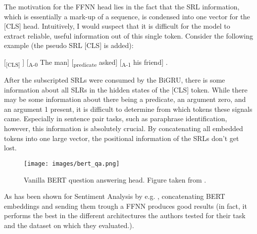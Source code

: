 
The motivation for the FFNN head lies in the fact that the SRL information, which is essentially
a mark-up of a sequence, is condensed into one vector for the [CLS] head. Intuitively, I would
suspect that it is difficult for the model to extract reliable, useful information out of this
single token. Consider the following example (the pseudo SRL [CLS] is added):


[\textsubscript{[CLS]} ] [\textsubscript{A-0} The man] [\textsubscript{predicate} asked] [\textsubscript{A-1} his friend] .

After the subscripted SRLs were consumed by the BiGRU, there is some information about all SLRs
in the hidden states of the [CLS] token. While there may be some information about there being a
predicate, an argument zero, and an argument 1 present, it is difficult to determine from which
tokens these signals came. Especially in sentence pair tasks, such as paraphrase identification,
however, this information is absolutely crucial. By concatenating all embedded tokens into one
large vector, the positional information of the SRLs don't get lost.

\begin{wrapfigure}[17]{r}{0.45\linewidth}
  \begin{center}
    \texttt{[image: images/bert\_qa.png]}
  \end{center}
  \caption[BERT Question Answering]{Vanilla BERT question answering head. Figure taken from \citep{devlin2018bert}.}
  \label{fig:bert-qa}
\end{wrapfigure}

As has been shown for Sentiment Analysis by e.g. \cite{myagmar2019transferable}, concatenating
BERT embeddings and sending them trough a FFNN produces good results (in fact, it performs the
best in the different architectures the authors tested for their task and the dataset on which
they evaluated.).


